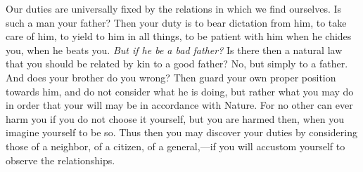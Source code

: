 Our duties are  universally fixed by the relations in  which we find ourselves.
Is such  a man your father?  Then your duty is  to bear dictation from  him, to
take care of him, to yield to him in all things, to be patient with him when he
chides you, when he beats you. \emph{But if  he be a bad father?} Is there then
a natural  law that  you should be  related by  kin to a  good father?  No, but
simply to  a father. And does  your brother do  you wrong? Then guard  your own
proper position towards him,  and do not consider what he  is doing, but rather
what you may do  in order that your will may be in  accordance with Nature. For
no other can ever harm you if you do not choose it yourself, but you are harmed
then, when  you imagine  yourself to  be so.  Thus then  you may  discover your
duties by considering those of a neighbor, of a citizen, of a general,---if you
will accustom yourself to observe the relationships.
